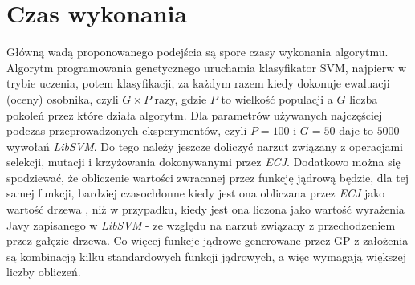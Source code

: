 %	
%          
%
%
%
%

		


\section{Czas wykonania}

Główną wadą proponowanego podejścia są spore czasy wykonania algorytmu. Algorytm programowania genetycznego uruchamia klasyfikator SVM, najpierw w trybie uczenia, potem klasyfikacji, za każdym razem kiedy dokonuje ewaluacji (oceny) osobnika, czyli $ G \times P $ razy, gdzie $ P $ to wielkość populacji a $ G $ liczba pokoleń przez które działa algorytm. Dla parametrów używanych najczęściej podczas przeprowadzonych eksperymentów, czyli $ P = 100 $ i $ G = 50 $ daje to $ 5000 $ wywołań \emph{LibSVM}. Do tego należy jeszcze doliczyć narzut związany z operacjami selekcji, mutacji i krzyżowania dokonywanymi przez \emph{ECJ}. Dodatkowo można się spodziewać, że obliczenie wartości zwracanej przez funkcję jądrową będzie, dla tej samej funkcji, bardziej czasochłonne kiedy jest ona obliczana przez \emph{ECJ} jako wartość drzewa , niż w przypadku, kiedy jest ona liczona jako wartość wyrażenia Javy zapisanego w \emph{LibSVM} - ze względu na narzut związany z przechodzeniem przez  gałęzie drzewa. Co więcej funkcje jądrowe generowane przez GP z założenia są kombinacją kilku standardowych funkcji jądrowych, a więc wymagają większej liczby obliczeń.

